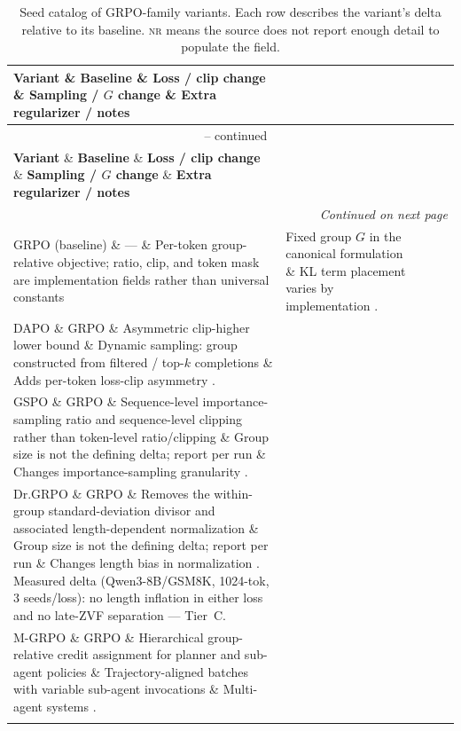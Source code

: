 \documentclass[11pt]{article}
\newcommand{\nr}{\textsc{nr}}
\newcommand{\grpo}{\textsc{GRPO}}
\begin{document}
\begin{longtable}{@{}p{2.1cm}p{2.4cm}p{3.0cm}p{2.0cm}p{3.3cm}@{}}
\caption{Seed catalog of \grpo{}-family variants. Each row describes the
  variant's delta relative to its baseline. \nr{} means the source does not
  report enough detail to populate the field.}\\
\toprule
\textbf{Variant} \& \textbf{Baseline} \& \textbf{Loss / clip change} \& \textbf{Sampling / $G$ change} \& \textbf{Extra regularizer / notes}\\
\midrule
\endfirsthead
\multicolumn{5}{c}{\tablename\ \thetable{} -- continued}\\
\toprule
\textbf{Variant} \& \textbf{Baseline} \& \textbf{Loss / clip change} \& \textbf{Sampling / $G$ change} \& \textbf{Extra regularizer / notes}\\
\midrule
\endhead
\midrule
\multicolumn{5}{r}{\textit{Continued on next page}}\\
\endfoot
\bottomrule
\endlastfoot

\grpo{} (baseline) \& --- \& Per-token group-relative objective; ratio, clip,
  and token mask are implementation fields rather than universal constants &
  Fixed group $G$ in the canonical formulation \& KL term placement varies by
  implementation \cite{zvfaudit2026}.\\
\addlinespace

DAPO \& \grpo{} \& Asymmetric clip-higher lower bound \& Dynamic sampling:
  group constructed from filtered / top-$k$ completions \& Adds per-token
  loss-clip asymmetry \cite{yu2025dapo}.\\
\addlinespace

GSPO \& \grpo{} \& Sequence-level importance-sampling ratio and sequence-level
  clipping rather than token-level ratio/clipping \& Group size is not the
  defining delta; report per run \& Changes
  importance-sampling granularity \cite{qwen2025gspo}.\\
\addlinespace

Dr.\grpo{} \& \grpo{} \& Removes the within-group standard-deviation divisor and
  associated length-dependent normalization \& Group size is not the defining
  delta; report per run \& Changes
  length bias in normalization \cite{tong2025drgrpo}. Measured delta
  (Qwen3-8B/GSM8K, 1024-tok, 3 seeds/loss): no length inflation in either
  loss and no late-ZVF separation --- Tier~C.\\
\addlinespace

M-\grpo{} \& \grpo{} \& Hierarchical group-relative credit assignment for
  planner and sub-agent policies \& Trajectory-aligned batches with variable
  sub-agent invocations \& Multi-agent systems \cite{hong2025mgrpo}.\\
\addlinespace


\end{longtable}
\end{document}
